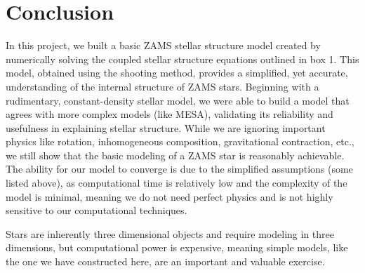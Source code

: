 \documentclass[twocolumn]{aastex631}
\begin{document}
\section{Conclusion}

In this project, we built a basic ZAMS stellar structure model created by numerically solving the coupled stellar structure equations outlined in box 1. This model, obtained using the shooting method, provides a simplified, yet accurate, understanding of the internal structure of ZAMS stars. Beginning with a rudimentary, constant-density stellar model, we were able to build a model that agrees with more complex models (like MESA), validating its reliability and usefulness in explaining stellar structure. While we are ignoring important physics like rotation, inhomogeneous composition, gravitational contraction, etc., we still show that the basic modeling of a ZAMS star is reasonably achievable. The ability for our model to converge is due to the simplified assumptions (some listed above), as computational time is relatively low and the complexity of the model is minimal, meaning we do not need perfect physics and is not highly sensitive to our computational techniques.

Stars are inherently three dimensional objects and require modeling in three dimensions, but computational power is expensive, meaning simple models, like the one we have constructed here, are an important and valuable exercise.
\end{document}
